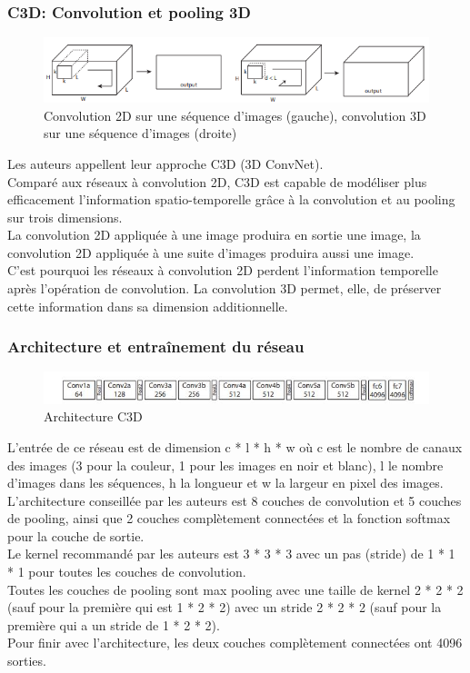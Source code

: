 \documentclass[11pt]{article}
\begin{document}
\subsubsection{C3D: Convolution et pooling 3D}
\label{sec:org3b29f9f}
\begin{figure}[htbp]
\centering
\includegraphics[width=.9\linewidth]{c3d_idea.png}
\caption{Convolution 2D sur une séquence d'images (gauche), convolution 3D sur une séquence d'images (droite) \label{c3d-idea}}
\end{figure}
Les auteurs appellent leur approche C3D (3D ConvNet).\\
Comparé aux réseaux à convolution 2D, C3D est capable de modéliser plus efficacement l'information spatio-temporelle grâce à la convolution et au pooling sur trois dimensions.\\
La convolution 2D appliquée à une image produira en sortie une image, la convolution 2D appliquée à une suite d'images produira aussi une image.\\
C'est pourquoi les réseaux à convolution 2D perdent l'information temporelle après l'opération de convolution. La convolution 3D permet, elle, de préserver cette information dans sa dimension additionnelle.\\

\subsubsection{Architecture et entraînement du réseau}
\label{sec:orge494dd3}
\begin{figure}[htbp]
\centering
\includegraphics[width=13cm]{c3d_architecture.jpg}
\caption{Architecture C3D \label{arch-c3d}}
\end{figure}
L'entrée de ce réseau est de dimension c * l * h * w où c est le nombre de canaux des images (3 pour la couleur, 1 pour les images en noir et blanc), l le nombre d'images dans les séquences, h la longueur et w la largeur en pixel des images.\\

L'architecture conseillée par les auteurs est 8 couches de convolution et 5 couches de pooling, ainsi que 2 couches complètement connectées et la fonction softmax pour la couche de sortie.\\
Le kernel recommandé par les auteurs est 3 * 3 * 3 avec un pas (stride) de 1 * 1 * 1 pour toutes les couches de convolution.\\
Toutes les couches de pooling sont max pooling avec une taille de kernel 2 * 2 * 2 (sauf pour la première qui est 1 * 2 * 2) avec un stride 2 * 2 * 2 (sauf pour la première qui a un stride de 1 * 2 * 2).\\
Pour finir avec l'architecture, les deux couches complètement connectées ont 4096 sorties.\\
\end{document}
